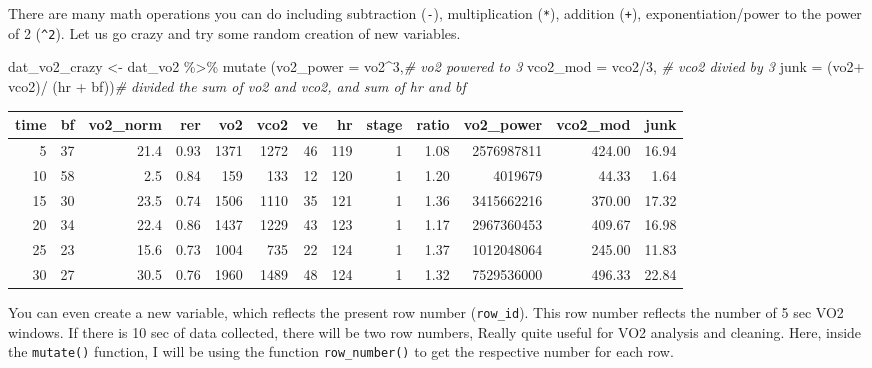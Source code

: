 \documentclass[
]{book}
\newenvironment{Shaded}{\begin{snugshade}}{\end{snugshade}}
\newcommand{\AttributeTok}[1]{\textcolor[rgb]{0.77,0.63,0.00}{#1}}
\newcommand{\CommentTok}[1]{\textcolor[rgb]{0.56,0.35,0.01}{\textit{#1}}}
\newcommand{\DecValTok}[1]{\textcolor[rgb]{0.00,0.00,0.81}{#1}}
\newcommand{\FunctionTok}[1]{\textcolor[rgb]{0.00,0.00,0.00}{#1}}
\newcommand{\NormalTok}[1]{#1}
\newcommand{\OtherTok}[1]{\textcolor[rgb]{0.56,0.35,0.01}{#1}}
\newcommand{\SpecialCharTok}[1]{\textcolor[rgb]{0.00,0.00,0.00}{#1}}
\begin{document}
There are many math operations you can do including subtraction (\texttt{-}), multiplication (\texttt{*}), addition (\texttt{+}), exponentiation/power to the power of 2 (\texttt{\^{}2}). Let us go crazy and try some random creation of new variables.

\begin{Shaded}
\begin{Highlighting}[]
\NormalTok{dat\_vo2\_crazy }\OtherTok{\textless{}{-}}\NormalTok{  dat\_vo2  }\SpecialCharTok{\%\textgreater{}\%}
  \FunctionTok{mutate}\NormalTok{ (}\AttributeTok{vo2\_power =}\NormalTok{ vo2}\SpecialCharTok{\^{}}\DecValTok{3}\NormalTok{,}\CommentTok{\# vo2 powered to 3 }
          \AttributeTok{vco2\_mod =}\NormalTok{ vco2}\SpecialCharTok{/}\DecValTok{3}\NormalTok{, }\CommentTok{\# vco2 divied by 3}
          \AttributeTok{junk =}\NormalTok{ (vo2}\SpecialCharTok{+}\NormalTok{ vco2)}\SpecialCharTok{/}\NormalTok{ (hr }\SpecialCharTok{+}\NormalTok{ bf))}\CommentTok{\# divided the sum of vo2 and vco2, and sum of hr and bf}
\end{Highlighting}
\end{Shaded}

\begin{tabular}{r|r|r|r|r|r|r|r|r|r|r|r|r}
\hline
time & bf & vo2\_norm & rer & vo2 & vco2 & ve & hr & stage & ratio & vo2\_power & vco2\_mod & junk\\
\hline
5 & 37 & 21.4 & 0.93 & 1371 & 1272 & 46 & 119 & 1 & 1.08 & 2576987811 & 424.00 & 16.94\\
\hline
10 & 58 & 2.5 & 0.84 & 159 & 133 & 12 & 120 & 1 & 1.20 & 4019679 & 44.33 & 1.64\\
\hline
15 & 30 & 23.5 & 0.74 & 1506 & 1110 & 35 & 121 & 1 & 1.36 & 3415662216 & 370.00 & 17.32\\
\hline
20 & 34 & 22.4 & 0.86 & 1437 & 1229 & 43 & 123 & 1 & 1.17 & 2967360453 & 409.67 & 16.98\\
\hline
25 & 23 & 15.6 & 0.73 & 1004 & 735 & 22 & 124 & 1 & 1.37 & 1012048064 & 245.00 & 11.83\\
\hline
30 & 27 & 30.5 & 0.76 & 1960 & 1489 & 48 & 124 & 1 & 1.32 & 7529536000 & 496.33 & 22.84\\
\hline
\end{tabular}

You can even create a new variable, which reflects the present row number (\texttt{row\_id}). This row number reflects the number of 5 sec VO2 windows. If there is 10 sec of data collected, there will be two row numbers, Really quite useful for VO2 analysis and cleaning. Here, inside the \texttt{mutate()} function, I will be using the function \texttt{row\_number()} to get the respective number for each row.
\end{document}
